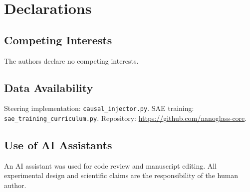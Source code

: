 \documentclass{article}
\begin{document}
\section*{Declarations}

\subsection*{Competing Interests}
The authors declare no competing interests.

\subsection*{Data Availability}
Steering implementation: \texttt{causal\_injector.py}. SAE training: \texttt{sae\_training\_curriculum.py}. Repository: \url{https://github.com/nanoglass-core}.

\subsection*{Use of AI Assistants}
An AI assistant was used for code review and manuscript editing. All experimental design and scientific claims are the responsibility of the human author.

\printbibliography
\end{document}
